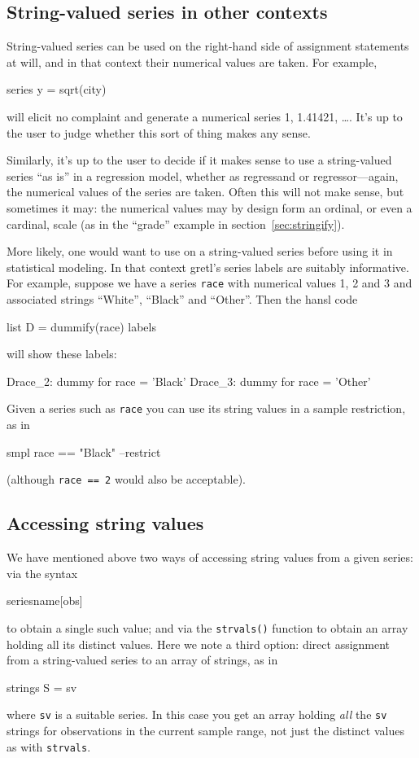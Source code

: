 \subsection{String-valued series in other contexts}

String-valued series can be used on the right-hand side of assignment
statements at will, and in that context their numerical values are
taken. For example,
%
\begin{code}
series y = sqrt(city)
\end{code}
%
will elicit no complaint and generate a numerical series 1, 1.41421,
\dots{}. It's up to the user to judge whether this sort of thing
makes any sense.

Similarly, it's up to the user to decide if it makes sense to use a
string-valued series ``as is'' in a regression model, whether as
regressand or regressor---again, the numerical values of the series
are taken. Often this will not make sense, but sometimes it may: the
numerical values may by design form an ordinal, or even a cardinal,
scale (as in the ``grade'' example in section~\ref{sec:stringify}).

More likely, one would want to use  on a string-valued
series before using it in statistical modeling. In that context
gretl's series labels are suitably informative. For example, suppose
we have a series \texttt{race} with numerical values 1, 2 and 3 and
associated strings ``White'', ``Black'' and ``Other''. Then the hansl
code
\begin{code}
list D = dummify(race)
labels
\end{code}
will show these labels:
\begin{code}
Drace_2: dummy for race = 'Black'
Drace_3: dummy for race = 'Other'
\end{code}

Given a series such as \texttt{race} you can use its string values in a
sample restriction, as in
\begin{code}
smpl race == "Black" --restrict
\end{code}
(although \texttt{race == 2} would also be acceptable).

\subsection{Accessing string values}

We have mentioned above two ways of accessing string values from a
given series: via the syntax
\begin{code}
seriesname[obs]
\end{code}
to obtain a single such value; and via the \texttt{strvals()} function
to obtain an array holding all its distinct values. Here we note a
third option: direct assignment from a string-valued series to an
array of strings, as in
%
\begin{code}
strings S = sv
\end{code}
%
where \texttt{sv} is a suitable series. In this case you get an array
holding \textit{all} the \texttt{sv} strings for observations in the
current sample range, not just the distinct values as with
\texttt{strvals}.

